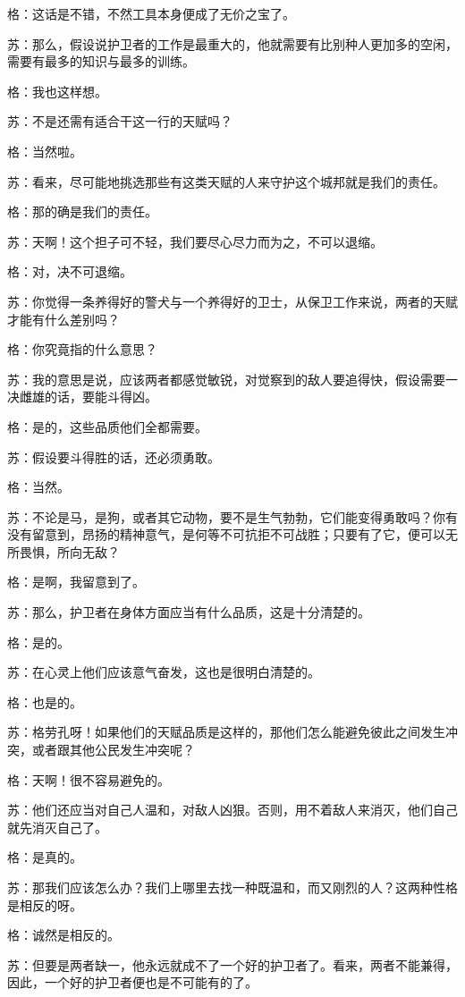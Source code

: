 \documentclass[11pt,oneside]{book}
\begin{document}
\begin{common-format}
格：这话是不错，不然工具本身便成了无价之宝了。

苏：那么，假设说护卫者的工作是最重大的，他就需要有比别种人更加多的空闲，需要有最多的知识与最多的训练。

格：我也这样想。

苏：不是还需有适合干这一行的天赋吗？

格：当然啦。

苏：看来，尽可能地挑选那些有这类天赋的人来守护这个城邦就是我们的责任。

格：那的确是我们的责任。

苏：天啊！这个担子可不轻，我们要尽心尽力而为之，不可以退缩。

格：对，决不可退缩。

苏：你觉得一条养得好的警犬与一个养得好的卫士，从保卫工作来说，两者的天赋才能有什么差别吗？

格：你究竟指的什么意思？

苏：我的意思是说，应该两者都感觉敏锐，对觉察到的敌人要追得快，假设需要一决雌雄的话，要能斗得凶。

格：是的，这些品质他们全都需要。

苏：假设要斗得胜的话，还必须勇敢。

格：当然。

苏：不论是马，是狗，或者其它动物，要不是生气勃勃，它们能变得勇敢吗？你有没有留意到，昂扬的精神意气，是何等不可抗拒不可战胜；只要有了它，便可以无所畏惧，所向无敌？

格：是啊，我留意到了。

苏：那么，护卫者在身体方面应当有什么品质，这是十分清楚的。

格：是的。

苏：在心灵上他们应该意气奋发，这也是很明白清楚的。

格：也是的。

苏：格劳孔呀！如果他们的天赋品质是这样的，那他们怎么能避免彼此之间发生冲突，或者跟其他公民发生冲突呢？

格：天啊！很不容易避免的。

苏：他们还应当对自己人温和，对敌人凶狠。否则，用不着敌人来消灭，他们自己就先消灭自己了。

格：是真的。

苏：那我们应该怎么办？我们上哪里去找一种既温和，而又刚烈的人？这两种性格是相反的呀。

格：诚然是相反的。

苏：但要是两者缺一，他永远就成不了一个好的护卫者了。看来，两者不能兼得，因此，一个好的护卫者便也是不可能有的了。


\end{common-format}
\end{document}
